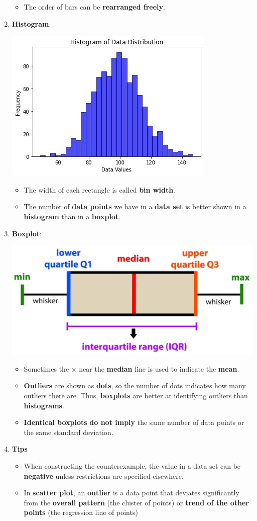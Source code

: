 \documentclass[10pt, landscape]{article}
\begin{document}
\begin{multicols}{4}
\begin{enumerate}
\begin{itemize}
        \item The order of bars can be \textbf{rearranged freely}.
    \end{itemize}
    \item \textbf{Histogram}: \\
    \centerline{\includegraphics[width=0.5\linewidth]{images/7.png}}
    \begin{itemize}
        \item The width of each rectangle is called \textbf{bin width}.
        \item The number of \textbf{data points} we have in a \textbf{data set} is better shown in a \textbf{histogram} than in a \textbf{boxplot}.
    \end{itemize}
    \item \textbf{Boxplot}: \\
    \centerline{\includegraphics[width=0.8\linewidth]{images/6.png}}
    \begin{itemize}
        \item Sometimes the $\times$ near the \textbf{median} line is used to indicate the \textbf{mean}.
        \item \textbf{Outliers} are shown as \textbf{dots}, so the number of dots indicates how many outliers there are. Thus, \textbf{boxplots} are better at identifying outliers than \textbf{histograms}.
        \item \textbf{Identical boxplots} \textbf{do not imply} the same number of data points or the same standard deviation.
    \end{itemize}
    \item \textbf{Tips}
    \begin{itemize}
        \item When constructing the counterexample, the value in a data set can be \textbf{negative} unless restrictions are specified elsewhere.
        \item In \textbf{scatter plot}, an \textbf{outlier} is a data point that deviates significantly from the \textbf{overall pattern} (the cluster of points) or \textbf{trend of the other points} (the regression line of points)
    \end{itemize}
\end{enumerate}

\end{multicols}
\end{document}
